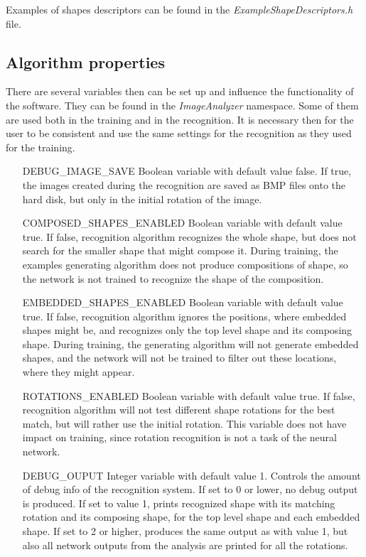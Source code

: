 Examples of shapes descriptors can be found in the \emph{ExampleShapeDescriptors.h} file.

\subsection{Algorithm properties}
There are several variables then can be set up and influence the functionality of the software. They can be found in the \emph{ImageAnalyzer} namespace. Some of them are used both in the training and in the recognition. It is necessary then for the user to be consistent and use the same settings for the recognition as they used for the training.

\begin{enumerate}
\item [DEBUG\_IMAGE\_SAVE] Boolean variable with default value false. If true, the images created during the recognition are saved as BMP files onto the hard disk, but only in the initial rotation of the image.

\item [COMPOSED\_SHAPES\_ENABLED] Boolean variable with default value true. If false, recognition algorithm recognizes the whole shape, but does not search for the smaller shape that might compose it. During training, the examples generating algorithm does not produce compositions of shape, so the network is not trained to recognize the shape of the composition.

\item [EMBEDDED\_SHAPES\_ENABLED] Boolean variable with default value true. If false, recognition algorithm ignores the positions, where embedded shapes might be, and recognizes only the top level shape and its composing shape. During training, the generating algorithm will not generate embedded shapes, and the network will not be trained to filter out these locations, where they might appear.

\item [ROTATIONS\_ENABLED] Boolean variable with default value true. If false, recognition algorithm will not test different shape rotations for the best match, but will rather use the initial rotation. This variable does not have impact on training, since rotation recognition is not a task of the neural network.

\item [DEBUG\_OUPUT] Integer variable with default value 1. Controls the amount of debug info of the recognition system. If set to 0 or lower, no debug output is produced. If set to value 1, prints recognized shape with its matching rotation and its composing shape, for the top level shape and each embedded shape. If set to 2 or higher, produces the same output as with value 1, but also all network outputs from the analysis are printed for all the rotations.


\end{enumerate}
